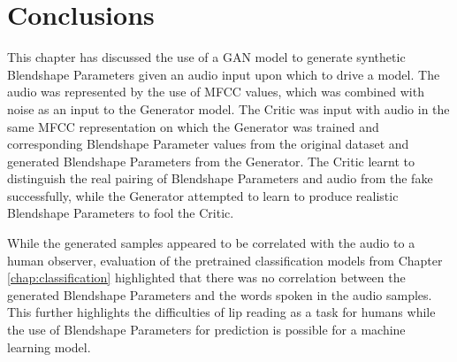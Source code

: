 \section{Conclusions}
This chapter has discussed the use of a GAN model to generate synthetic Blendshape Parameters given an audio input upon which to drive a model.
The audio was represented by the use of MFCC values, which was combined with noise as an input to the Generator model.
The Critic was input with audio in the same MFCC representation on which the Generator was trained and corresponding Blendshape Parameter values from the original dataset and generated Blendshape Parameters from the Generator.
The Critic learnt to distinguish the real pairing of Blendshape Parameters and audio from the fake successfully, while the Generator attempted to learn to produce realistic Blendshape Parameters to fool the Critic.

While the generated samples appeared to be correlated with the audio to a human observer, evaluation of the pretrained classification models from Chapter \ref{chap:classification} highlighted that there was no correlation between the generated Blendshape Parameters and the words spoken in the audio samples.
This further highlights the difficulties of lip reading as a task for humans while the use of Blendshape Parameters for prediction is possible for a machine learning model.
